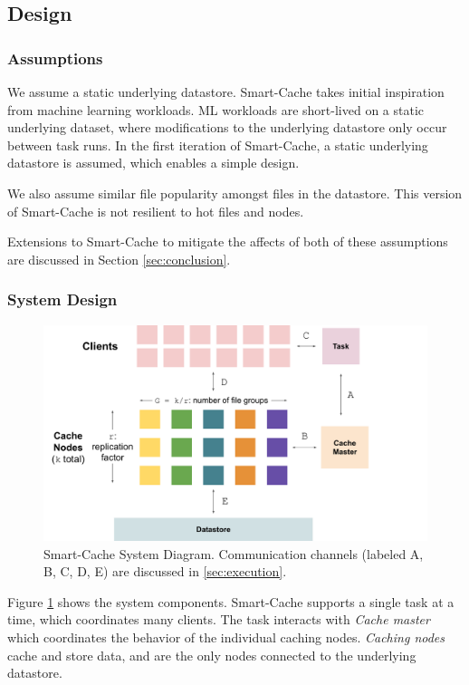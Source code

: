 \documentclass[sigconf]{acmart}
\begin{document}
\subsection{Design}
\label{sec:design}
\subsubsection{Assumptions}
\label{sec:assumptions}

We assume a static underlying datastore. Smart-Cache takes initial inspiration from machine learning workloads. ML workloads are short-lived on a static underlying dataset, where modifications to the underlying datastore only occur between task runs. In the first iteration of Smart-Cache, a static underlying datastore is assumed, which enables a simple design.

We also assume similar file popularity amongst files in the datastore. This version of Smart-Cache is not resilient to hot files and nodes.

Extensions to Smart-Cache to mitigate the affects of both of these assumptions are discussed in Section \ref{sec:conclusion}.

\subsubsection{System Design}
\label{sec:systemdesign}

\begin{figure}[h]
  \centering
  \includegraphics[width=\linewidth]{systemdiagram.pdf}
  \caption{\label{fig:systemdesign} Smart-Cache System Diagram. Communication channels (labeled A, B, C, D, E) are discussed in \ref{sec:execution}. }
\end{figure}

Figure \ref{fig:systemdesign} shows the system components. Smart-Cache supports a single task at a time, which coordinates many clients. The task interacts with \textit{Cache master} which coordinates the behavior of the individual caching nodes. \textit{Caching nodes} cache and store data, and are the only nodes connected to the underlying datastore. 
\end{document}
